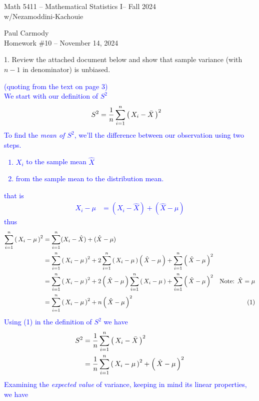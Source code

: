 \documentclass[10pt,a4paper]{report}
\newcommand{\CLASSNAME}{Math 5411 -- Mathematical Statistics I}
\newcommand{\PROFESSOR}{Nezamoddini-Kachouie}
\newcommand{\STUDENTNAME}{Paul Carmody}
\newcommand{\ASSIGNMENT}{Homework \#10 }
\newcommand{\DUEDATE}{November 14, 2024}
\newcommand{\SEMESTER}{Fall 2024}
\newcommand{\BLUE}[1]{\textcolor{blue}{#1}}
\begin{document}
\begin{center}
	\Large{\CLASSNAME -- \SEMESTER} \\
	\large{w/\PROFESSOR}
\end{center}
\begin{center}
	\STUDENTNAME \\
	\ASSIGNMENT -- \DUEDATE\\
\end{center}

1. Review the attached document below and show that sample variance (with $n-1$ in denominator) is unbiased. \\

\noindent \BLUE{(quoting from the text on page 3)\\
We start with our definition of $S^2$
\begin{align*}
	S^2 &= \frac{1}{n} \sum_{i=1}^n \left (\, X_i-\bar{X} \,\right )^2
 \end{align*}To find the \textit{mean of $S^2$}, we'll the difference between our observation using two steps.
 \begin{enumerate}
 	\item $X_i$ to the sample mean $\hat{X}$
 	\item from the sample mean to the distribution mean.
 \end{enumerate}that is
 \begin{align*}
 	X_i - \mu &= (X_i-\hat{X})+(\hat{X} - \mu)
 \end{align*}thus
	\begin{align*}
		\sum_{i=1}^n \left (\, X_i - \mu \,\right )^2 &= \sum_{i=1}^n (X_i-\hat{X})+(\hat{X} - \mu)\\
			&= \sum_{i=1}^n \left (\, X_i - \mu \,\right )^2 + 2 \sum_{i=1}^n \left (\, X_i - \mu \,\right )\left (\, \hat{X}-\mu \,\right ) + \sum_{i=1}^n \left (\, \hat{X} - \mu \,\right )^2 \\
			&= \sum_{i=1}^n \left (\, X_i - \mu \,\right )^2 + 2\left (\, \hat{X}-\mu \,\right ) \sum_{i=1}^n \left (\, X_i - \mu \,\right ) + \sum_{i=1}^n \left (\, \hat{X} - \mu \,\right )^2 &\text{Note: }\hat{X} = \mu \\
			&= \sum_{i=1}^n \left (\, X_i - \mu \,\right )^2 + n \left (\, \hat{X} - \mu \,\right )^2 & (1)
	\end{align*}Using (1) in the definition of $S^2$ we have
	\begin{align*}
		S^2 &= \frac{1}{n} \sum_{i=1}^n \left (\, X_i-\bar{X} \,\right )^2 \\
			&= \frac{1}{n} \sum_{i=1}^n \left (\, X_i - \mu \,\right )^2 + \left (\, \hat{X} - \mu \,\right )^2 \\
	\end{align*}Examining the \textit{expected value} of variance, keeping in mind its linear properties, we have
}
\end{document}
